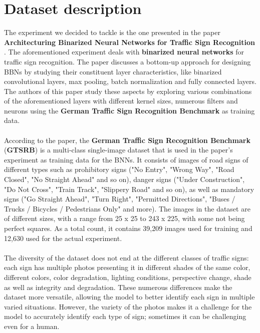 \documentclass[12pt,a4paper]{report}
\newcommand\tab[1][5mm]{\hspace*{#1}}
\begin{document}
\chapter{Dataset description}
\tab The experiment we decided to tackle is the one presented in the paper \textbf{Architecturing Binarized Neural Networks for Traffic Sign Recognition} \cite{traffic_signs_paper}. The aforementioned experiment deals with \textbf{binarized neural networks} for traffic sign recognition. The paper discusses a bottom-up approach for designing BBNs by studying their constituent layer characteristics, like binarized convolutional layers, max pooling, batch normalization and fully connected layers. The authors of this paper study these aspects by exploring various combinations of the aforementioned layers with different kernel sizes, numerous filters and neurons using the \textbf{German Traffic Sign Recognition Benchmark} as training data.\\\\
\tab According to the paper, the \textbf{German Traffic Sign Recognition Benchmark} (\textbf{GTSRB}) is a multi-class single-image dataset that is used in the paper's experiment as training data for the BNNs. It consists of images of road signs of different types such as prohibitory signs ("No Entry", "Wrong Way", "Road Closed", "No Straight Ahead" and so on), danger signs ("Under Construction", "Do Not Cross", "Train Track", "Slippery Road" and so on), as well as mandatory signs ("Go Straight Ahead", "Turn Right", "Permitted Directions", "Buses / Trucks / Bicycles / Pedestrians Only" and more). The images in the dataset are of different sizes, with a range from 25 x 25 to 243 x 225, with some not being perfect squares. As a total count, it contains 39,209 images used for training and 12,630 used for the actual experiment.\\\\
\tab The diversity of the dataset does not end at the different classes of traffic signs: each sign has multiple photos presenting it in different shades of the same color, different colors, color degradation, lighting conditions, perspective change, shade as well as integrity and degradation. These numerous differences make the dataset more versatile, allowing the model to better identify each sign in multiple varied situations. However, the variety of the photos makes it a challenge for the model to accurately identify each type of sign; sometimes it can be challenging even for a human.\\ \\
\end{document}
